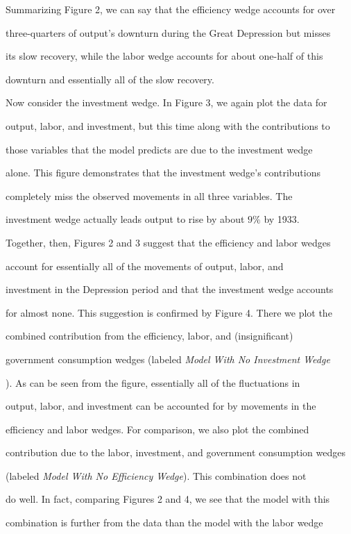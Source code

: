 \documentclass[fleqn,leqno,11pt]{article}
\begin{document}
Summarizing Figure 2, we can say that the efficiency wedge accounts for over

three-quarters of output's downturn during the Great Depression but misses

its slow recovery, while the labor wedge accounts for about one-half of this

downturn and essentially all of the slow recovery.



Now consider the investment wedge. In Figure 3, we again plot the data for

output, labor, and investment, but this time along with the contributions to

those variables that the model predicts are due to the investment wedge

alone. This figure demonstrates that the investment wedge's contributions

completely miss the observed movements in all three variables. The

investment wedge actually leads output to rise by about $9\%$ by 1933.



Together, then, Figures 2 and 3 suggest that the efficiency and labor wedges

account for essentially all of the movements of output, labor, and

investment in the Depression period and that the investment wedge accounts

for almost none. This suggestion is confirmed by Figure 4. There we plot the

combined contribution from the efficiency, labor, and (insignificant)

government consumption wedges (labeled \emph{Model With No Investment Wedge}%

). As can be seen from the figure, essentially all of the fluctuations in

output, labor, and investment can be accounted for by movements in the

efficiency and labor wedges. For comparison, we also plot the combined

contribution due to the labor, investment, and government consumption wedges

(labeled \emph{Model With No Efficiency Wedge}). This combination does not

do well. In fact, comparing Figures 2 and 4, we see that the model with this

combination is further from the data than the model with the labor wedge
\end{document}
